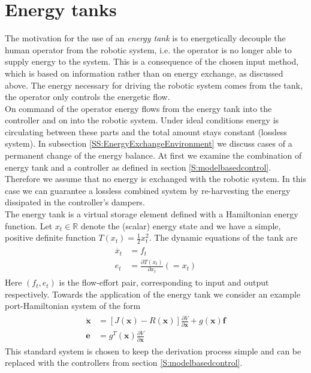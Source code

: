 \documentclass[a4paper,twoside, openright,12pt]{report}
\newcommand{\f}[1]{\boldsymbol{#1}}
\begin{document}
\section{Energy tanks}
The motivation for the use of an \emph{energy tank} is to energetically decouple the human operator from the robotic system, i.e. the operator is no longer able to supply energy to the system. This is a consequence of the chosen input method, which is based on information rather than on energy exchange, as discussed above. The energy necessary for driving the robotic system comes from the tank, the operator only controls the energetic flow.\\
On command of the operator energy flows from the energy tank into the controller and on into the robotic system. Under ideal conditions energy is circulating between these parts and the total amount stays constant (lossless system). In subsection \ref{SS:EnergyExchangeEnvironment} we discuss cases of a permanent change of the energy balance. At first we examine the combination of energy tank and a controller as defined in section \ref{S:modelbasedcontrol}. Therefore we assume that no energy is exchanged with the robotic system. In this case we can guarantee a lossless combined system by re-harvesting the energy dissipated in the controller's dampers. \\ 
The energy tank is a virtual storage element defined with a Hamiltonian energy function. Let $x_t \in \mathbb{R}$ denote the (scalar) energy state and we have a simple, positive definite function $T(x_t) = \frac{1}{2}x_t^2$. The dynamic equations of the tank are
\begin{eqnarray}
\begin{aligned}
\dot{x_t} &= f_t \\
e_t &= \frac{\partial T(x_t)}{\partial x_t} (=x_t)
\end{aligned}
\end{eqnarray}
Here $(f_t,e_t)$ is the flow-effort pair, corresponding to input and output respectively. Towards the application of the energy tank we consider an example port-Hamiltonian system of the form
\begin{eqnarray}
\begin{aligned}
\dot{\f{x}} &= [J(\f{x}) - R(\f{x})] \frac{\partial V}{\partial \f{x}} + g(\f{x})\f{f} \\
\f{e} &= g^T(\f{x}) \frac{\partial V}{\partial \f{x}}
\end{aligned}
\end{eqnarray}
This standard system is chosen to keep the derivation process simple and can be replaced with the controllers from section \ref{S:modelbasedcontrol}.
\end{document}
